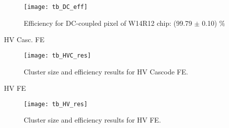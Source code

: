 \begin{figure}[h!]
\centering
\texttt{[image: tb\_DC\_eff]}
\caption{Efficiency for DC-coupled pixel of W14R12 chip: (99.79 $\pm$ 0.10) \%}
\label{fig:tb_DC_Cz}
\end{figure}



\begin{description}
\item[HV Casc. FE]
\end{description}

\begin{figure}[h!]
\centering
\texttt{[image: tb\_HVC\_res]}
\caption{Cluster size and efficiency results for HV Cascode FE.}
\label{fig:tb_HVC}
\end{figure}


\begin{description}
\item[HV FE]
\end{description}

\begin{figure}[h!]
\centering
\texttt{[image: tb\_HV\_res]}
\caption{Cluster size and efficiency results for HV FE.}
\label{fig:tb_HV}
\end{figure}
















































